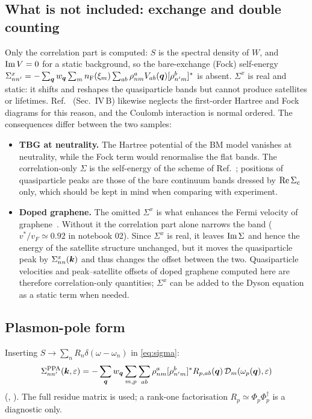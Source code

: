 \subsection{What is not included: exchange and double counting}
\label{sec:exchange}

Only the correlation part is computed: $S$ is the spectral density of $W$, and $\operatorname{Im} V=0$ for a static
background, so the bare-exchange (Fock) self-energy
$\Sigma^x_{nn'}=-\sum_{\bm q}w_{\bm q}\sum_mn_{\rm F}(\xi_m)\sum_{ab}\rho^a_{nm}V_{ab}(\bm q)[\rho^b_{n'm}]^*$ is absent.
$\Sigma^x$ is real and static: it shifts and reshapes the quasiparticle bands but cannot produce satellites or
lifetimes. Ref.~\cite{Wei2025} (Sec.~IV\,B) likewise neglects the first-order Hartree and Fock diagrams for
this reason, and the Coulomb interaction is normal ordered. The consequences differ between the two samples:
\begin{itemize}
\item \textbf{TBG at neutrality.} The Hartree potential of the BM model vanishes at neutrality, while the Fock term
would renormalise the flat bands. The correlation-only $\Sigma$ is the self-energy of the
scheme of Ref.~\cite{Wei2025}; positions of quasiparticle peaks are those of the bare continuum bands dressed
by $\operatorname{Re}\Sigma_c$ only, which should be kept in mind when comparing with experiment.
\item \textbf{Doped graphene.} The omitted $\Sigma^x$ is what enhances the Fermi velocity of
graphene~\cite{Elias2011}. Without it the correlation part alone narrows the band
($v^*/v_F\simeq0.92$ in notebook 02). Since $\Sigma^x$ is real, it leaves $\operatorname{Im}\Sigma$ and hence the energy of
the satellite structure unchanged, but it moves the quasiparticle peak by $\Sigma^x_{nn}(\bm k)$ and thus changes
the offset between the two. Quasiparticle velocities and peak--satellite offsets of doped graphene computed
here are therefore correlation-only quantities; $\Sigma^x$ can be added to the Dyson equation as a static term
when needed.
\end{itemize}

\subsection{Plasmon-pole form}

Inserting $S\to\sum_nR_n\delta(\omega-\omega_n)$ in \cref{eq:sigma}:
\begin{equation}
\Sigma^{\rm PPA}_{nn'}(\bm k,\varepsilon)=-\sum_{\bm q}w_{\bm q}\sum_{m,p}\sum_{ab}\rho^a_{nm}[\rho^b_{n'm}]^*R_{p,ab}(\bm q)\,
\mathcal D_m(\omega_p(\bm q),\varepsilon)
\end{equation}
(, ). The full residue matrix is used;
a rank-one factorisation $R_p\simeq\Phi_p\Phi_p^\dagger$ is a diagnostic only.


